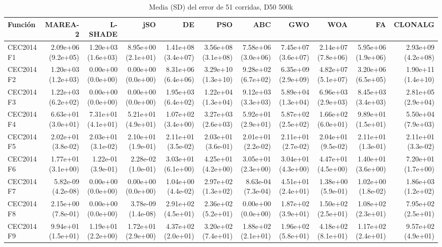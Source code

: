 \begin{longtable}{lrrrrrrrrrr}
\caption{Media (SD) del error de 51 corridas, D50 500k}\\
\toprule
Función & MAREA-2 & L-SHADE & jSO & DE & PSO & ABC & GWO & WOA & FA & CLONALG \\
\midrule
\endhead
CEC2014 F1 & 2.09e+06 (9.2e+05) & 1.20e+03 (1.6e+03) & 8.95e+00 (2.1e+01) & 1.41e+08 (3.4e+07) & 3.56e+08 (3.1e+08) & 7.58e+06 (3.0e+06) & 7.45e+07 (3.6e+07) & 2.14e+07 (7.8e+06) & 5.95e+06 (1.9e+06) & 2.93e+09 (4.2e+08) \\
CEC2014 F2 & 1.20e+03 (1.2e+03) & 0.00e+00 (0.0e+00) & 0.00e+00 (0.0e+00) & 8.31e+06 (6.4e+06) & 3.29e+10 (1.3e+10) & 9.28e+02 (6.7e+02) & 6.35e+09 (2.9e+09) & 4.82e+07 (5.1e+07) & 3.20e+06 (6.5e+05) & 1.90e+11 (1.4e+10) \\
CEC2014 F3 & 1.22e+03 (6.2e+02) & 0.00e+00 (0.0e+00) & 0.00e+00 (0.0e+00) & 1.95e+03 (6.4e+02) & 1.22e+04 (1.3e+04) & 9.12e+03 (3.3e+03) & 5.89e+04 (1.3e+04) & 6.96e+03 (2.9e+03) & 8.45e+03 (3.4e+03) & 2.81e+05 (2.9e+04) \\
CEC2014 F4 & 6.63e+01 (3.0e+01) & 7.31e+01 (4.1e+01) & 5.21e+01 (4.9e+01) & 1.07e+02 (3.4e+00) & 3.27e+03 (2.6e+03) & 5.92e+01 (2.9e+01) & 5.87e+02 (2.5e+02) & 1.66e+02 (6.0e+01) & 9.89e+01 (1.5e+01) & 5.50e+04 (7.9e+03) \\
CEC2014 F5 & 2.02e+01 (3.8e-02) & 2.03e+01 (3.1e-02) & 2.10e+01 (1.9e-01) & 2.11e+01 (3.5e-02) & 2.03e+01 (3.6e-01) & 2.01e+01 (2.2e-02) & 2.11e+01 (2.7e-02) & 2.04e+01 (9.5e-02) & 2.11e+01 (1.3e-01) & 2.11e+01 (3.3e-02) \\
CEC2014 F6 & 1.77e+01 (3.1e+00) & 1.22e-01 (3.9e-01) & 2.28e-02 (1.0e-01) & 3.03e+01 (6.1e+00) & 4.25e+01 (4.2e+00) & 3.05e+01 (2.3e+00) & 3.04e+01 (4.3e+00) & 4.47e+01 (4.5e+00) & 1.40e+01 (3.6e+00) & 7.20e+01 (1.7e+00) \\
CEC2014 F7 & 5.82e-09 (4.2e-08) & 0.00e+00 (0.0e+00) & 0.00e+00 (0.0e+00) & 1.04e+00 (4.4e-02) & 2.97e+02 (1.3e+02) & 8.63e-04 (7.3e-04) & 4.51e+01 (2.4e+01) & 1.38e+00 (5.9e-01) & 1.02e+00 (1.8e-02) & 1.86e+03 (1.2e+02) \\
CEC2014 F8 & 2.15e+00 (7.8e-01) & 0.00e+00 (0.0e+00) & 3.78e-09 (1.4e-08) & 2.91e+02 (4.5e+01) & 2.36e+02 (5.2e+01) & 0.00e+00 (0.0e+00) & 1.87e+02 (3.9e+01) & 1.50e+02 (2.5e+01) & 1.08e+02 (2.3e+01) & 7.95e+02 (2.5e+01) \\
CEC2014 F9 & 9.94e+01 (1.5e+01) & 1.19e+01 (2.2e+00) & 1.72e+01 (2.9e+00) & 4.37e+02 (2.0e+01) & 3.20e+02 (7.4e+01) & 1.88e+02 (2.1e+01) & 1.96e+02 (5.8e+01) & 4.18e+02 (8.1e+01) & 1.17e+02 (2.4e+01) & 9.57e+02 (4.9e+01) \\

\end{longtable}
